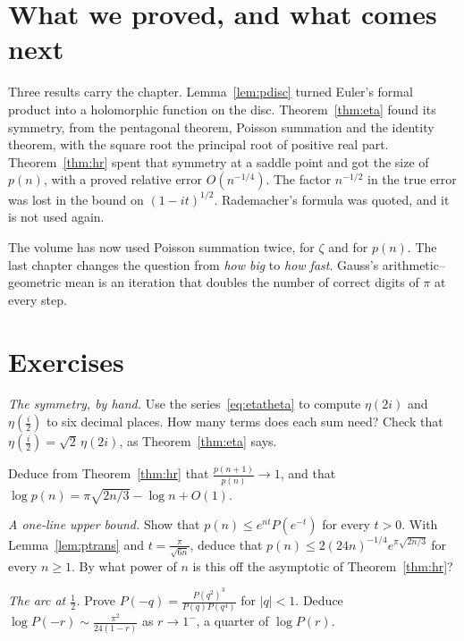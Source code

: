 \section{What we proved, and what comes next}

Three results carry the chapter. Lemma~\ref{lem:pdisc} turned Euler's formal product into a holomorphic function on the disc. Theorem~\ref{thm:eta} found its symmetry, from the pentagonal theorem, Poisson summation and the identity theorem, with the square root the principal root of positive real part. Theorem~\ref{thm:hr} spent that symmetry at a saddle point and got the size of $p(n)$, with a proved relative error $O(n^{-1/4})$. The factor $n^{-1/2}$ in the true error was lost in the bound on $(1-it)^{1/2}$. Rademacher's formula was quoted, and it is not used again.

The volume has now used Poisson summation twice, for $\zeta$ and for $p(n)$. The last chapter changes the question from \emph{how big} to \emph{how fast}. Gauss's arithmetic--geometric mean is an iteration that doubles the number of correct digits of $\pi$ at every step.

\section{Exercises}

\begin{exercise}[$\star$]\label{ex:etacheck}
\emph{The symmetry, by hand.} Use the series~\eqref{eq:etatheta} to compute $\eta(2i)$ and $\eta(\frac i2)$ to six decimal places. How many terms does each sum need? Check that $\eta(\frac i2)=\sqrt2\,\eta(2i)$, as Theorem~\ref{thm:eta} says.
\end{exercise}

\begin{exercise}[$\star$]\label{ex:ratio}
Deduce from Theorem~\ref{thm:hr} that $\frac{p(n+1)}{p(n)}\to1$, and that $\log p(n)=\pi\sqrt{2n/3}-\log n+O(1)$.
\end{exercise}

\begin{exercise}[$\star$]\label{ex:saddle}
\emph{A one-line upper bound.} Show that $p(n)\le e^{nt}P(e^{-t})$ for every $t>0$. With Lemma~\ref{lem:ptrans} and $t=\frac\pi{\sqrt{6n}}$, deduce that $p(n)\le2(24n)^{-1/4}e^{\pi\sqrt{2n/3}}$ for every $n\ge1$. By what power of $n$ is this off the asymptotic of Theorem~\ref{thm:hr}?
\end{exercise}

\begin{exercise}[$\star\star$]\label{ex:minusone}
\emph{The arc at $\frac12$.} Prove $P(-q)=\frac{P(q^2)^3}{P(q)P(q^4)}$ for $|q|<1$. Deduce $\log P(-r)\sim\frac{\pi^2}{24(1-r)}$ as $r\to1^-$, a quarter of $\log P(r)$.
\end{exercise}

